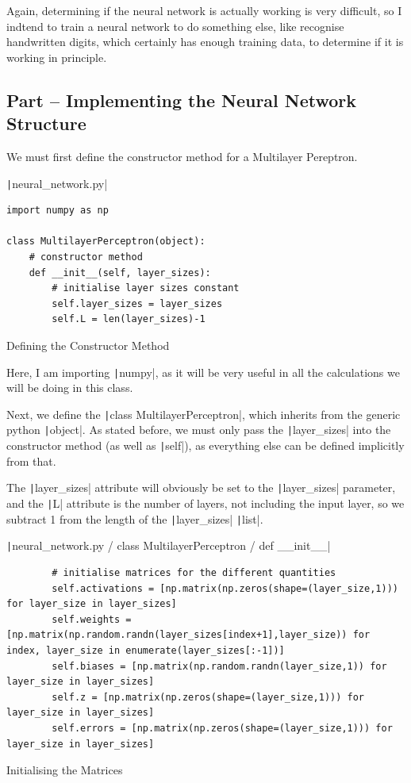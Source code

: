 \documentclass[12pt]{report}
\newcommand{\pil}[1]{\protect\texttt|#1|}
\begin{document}
Again, determining if the neural network is actually working is very difficult, so I indtend to train a neural network to do something else, like recognise handwritten digits, which certainly has enough training data, to determine if it is working in principle.

\subsection{Part \theparts{} -- Implementing the Neural Network Structure}

We must first define the constructor method for a Multilayer Pereptron.

\begin{listing}[H]
\pil{neural_network.py}
\begin{verbatim}
import numpy as np

class MultilayerPerceptron(object):
    # constructor method
    def __init__(self, layer_sizes):
        # initialise layer sizes constant
        self.layer_sizes = layer_sizes
        self.L = len(layer_sizes)-1
\end{verbatim}
\caption{Defining the Constructor Method}\label{cs:definingConstructor}
\end{listing}

Here, I am importing \pil{numpy}, as it will be very useful in all the calculations we will be doing in this class.

Next, we define the \pil{class MultilayerPerceptron}, which inherits from the generic python \pil{object}. As stated before, we must only pass the \pil{layer_sizes} into the constructor method (as well as \pil{self}), as everything else can be defined implicitly from that.

The \pil{layer_sizes} attribute will obviously be set to the \pil{layer_sizes} parameter, and the \pil{L} attribute is the number of layers, not including the input layer, so we subtract 1 from the length of the \pil{layer_sizes} \pil{list}.

\begin{listing}[H]
\pil{neural_network.py / class MultilayerPerceptron / def __init__}
\begin{verbatim}
        # initialise matrices for the different quantities
        self.activations = [np.matrix(np.zeros(shape=(layer_size,1))) for layer_size in layer_sizes]
        self.weights = [np.matrix(np.random.randn(layer_sizes[index+1],layer_size)) for index, layer_size in enumerate(layer_sizes[:-1])]
        self.biases = [np.matrix(np.random.randn(layer_size,1)) for layer_size in layer_sizes]
        self.z = [np.matrix(np.zeros(shape=(layer_size,1))) for layer_size in layer_sizes]
        self.errors = [np.matrix(np.zeros(shape=(layer_size,1))) for layer_size in layer_sizes]
\end{verbatim}
\caption{Initialising the Matrices}\label{cs:initialisingMatrices}
\end{listing}
\end{document}
